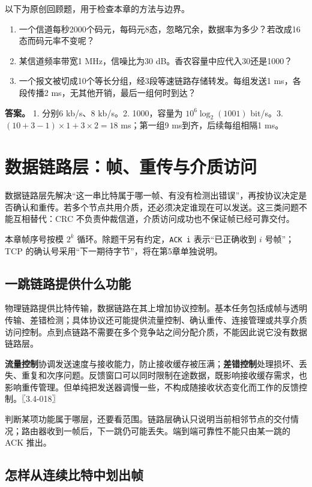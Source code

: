 以下为原创回顾题，用于检查本章的方法与边界。

\begin{enumerate}
\def\labelenumi{\arabic{enumi}.}
\tightlist
\item
  一个信道每秒2000个码元，每码元8态，忽略冗余，数据率为多少？若改成16态而码元率不变呢？
\item
  某信道频率带宽1 MHz，信噪比为30 dB。香农容量中应代入30还是1000？
\item
  一个报文被切成10个等长分组，经3段等速链路存储转发。每组发送1 ms，各段传播2 ms，无其他开销，最后一组何时到达？
\end{enumerate}

\textbf{答案。} 1. 分别6 kb/s、8 kb/s。2. 1000，容量为 \(10^6\log_2(1001)\) bit/s。3. \((10+3-1)\times1+3\times2=18\) ms；第一组9 ms到齐，后续每组相隔1 ms。

\chapter{数据链路层：帧、重传与介质访问}\label{cn-ch3}

数据链路层先解决``这一串比特属于哪一帧、有没有检测出错误''，再按协议决定是否确认和重传。若多个节点共用介质，还必须决定谁现在可以发送。这三类问题不能互相替代：CRC 不负责仲裁信道，介质访问成功也不保证帧已经可靠交付。

本章帧序号按模 \(2^k\) 循环。除题干另有约定，\allowbreak{}\texttt{ACK\ i} 表示``已正确收到 \(i\) 号帧''；TCP 的确认号采用``下一期待字节''，将在第5章单独说明。

\section{一跳链路提供什么功能}\label{cn-03-01}

物理链路提供比特传输，数据链路在其上增加协议控制。基本任务包括成帧与透明传输、差错检测；具体协议还可能提供流量控制、确认重传、连接管理或共享介质访问控制。点到点链路不需要在多个竞争站之间分配介质，不能因此说它没有数据链路层。

\textbf{流量控制}协调发送速度与接收能力，防止接收缓存被压满；\textbf{差错控制}处理损坏、丢失、重复和次序问题。反馈窗口可以同时限制在途数据，既影响接收缓存需求，也影响重传管理。但单纯把发送器调慢一些，不构成随接收状态变化而工作的反馈控制。〖3.4-018〗

判断某项功能属于哪层，还要看范围。链路层确认只说明当前相邻节点的交付情况；路由器收到一帧后，下一跳仍可能丢失。端到端可靠性不能只由某一跳的 ACK 推出。

\section{怎样从连续比特中划出帧}\label{cn-03-02}

